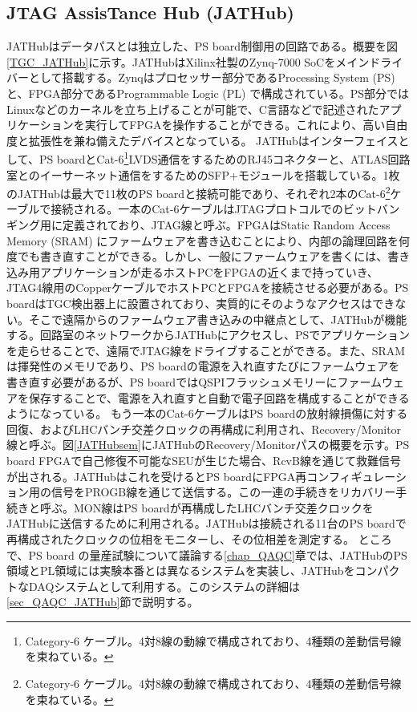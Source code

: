         \subsection*{JTAG AssisTance Hub (JATHub)}
    JATHubはデータパスとは独立した、PS board制御用の回路である。概要を図\ref{TGC_JATHub}に示す。JATHubはXilinx社製のZynq-7000 SoCをメインドライバーとして搭載する。Zynqはプロセッサー部分であるProcessing System  (PS) と、FPGA部分であるProgrammable Logic  (PL) で構成されている。PS部分ではLinuxなどのカーネルを立ち上げることが可能で、C言語などで記述されたアプリケーションを実行してFPGAを操作することができる。これにより、高い自由度と拡張性を兼ね備えたデバイスとなっている。
    JATHubはインターフェイスとして、PS boardとCat-6\footnote{Category-6 ケーブル。4対8線の動線で構成されており、4種類の差動信号線を束ねている。}LVDS通信をするためのRJ45コネクターと、ATLAS回路室とのイーサーネット通信をするためのSFP+モジュールを搭載している。1枚のJATHubは最大で11枚のPS boardと接続可能であり、それぞれ2本のCat-6\footnote{Category-6 ケーブル。4対8線の動線で構成されており、4種類の差動信号線を束ねている。}ケーブルで接続される。一本のCat-6ケーブルはJTAGプロトコルでのビットバンギング用に定義されており、JTAG線と呼ぶ。FPGAはStatic Random Access Memory  (SRAM) にファームウェアを書き込むことにより、内部の論理回路を何度でも書き直すことができる。しかし、一般にファームウェアを書くには、書き込み用アプリケーションが走るホストPCをFPGAの近くまで持っていき、JTAG4線用のCopperケーブルでホストPCとFPGAを接続させる必要がある。PS boardはTGC検出器上に設置されており、実質的にそのようなアクセスはできない。そこで遠隔からのファームウェア書き込みの中継点として、JATHubが機能する。回路室のネットワークからJATHubにアクセスし、PSでアプリケーションを走らせることで、遠隔でJTAG線をドライブすることができる。また、SRAMは揮発性のメモリであり、PS boardの電源を入れ直すたびにファームウェアを書き直す必要があるが、PS boardではQSPIフラッシュメモリーにファームウェアを保存することで、電源を入れ直すと自動で電子回路を構成することができるようになっている。
    もう一本のCat-6ケーブルはPS boardの放射線損傷に対する回復、およびLHCバンチ交差クロックの再構成に利用され、Recovery/Monitor線と呼ぶ。図\ref{JATHubsem}にJATHubのRecovery/Monitorパスの概要を示す。PS board FPGAで自己修復不可能なSEUが生じた場合、RcvB線を通じて救難信号が出される。JATHubはこれを受けるとPS boardにFPGA再コンフィギュレーション用の信号をPROGB線を通じて送信する。この一連の手続きをリカバリー手続きと呼ぶ。MON線はPS boardが再構成したLHCバンチ交差クロックをJATHubに送信するために利用される。JATHubは接続される11台のPS boardで再構成されたクロックの位相をモニターし、その位相差を測定する。
    ところで、PS board の量産試験について議論する\ref{chap_QAQC}章では、JATHubのPS領域とPL領域には実験本番とは異なるシステムを実装し、JATHubをコンパクトなDAQシステムとして利用する。このシステムの詳細は\ref{sec_QAQC_JATHub}節で説明する。



